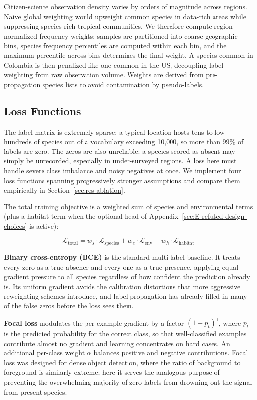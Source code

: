 Citizen-science observation density varies by orders of magnitude across regions. Naive global weighting would upweight common species in data-rich areas while suppressing species-rich tropical communities. We therefore compute region-normalized frequency weights: samples are partitioned into coarse geographic bins, species frequency percentiles are computed within each bin, and the maximum percentile across bins determines the final weight. A species common in Colombia is then penalized like one common in the US, decoupling label weighting from raw observation volume. Weights are derived from pre-propagation species lists to avoid contamination by pseudo-labels.

\subsection{Loss Functions}
\label{sec:loss}

The label matrix is extremely sparse: a typical location hosts tens to low hundreds of species out of a vocabulary exceeding 10,000, so more than 99\% of labels are zero. The zeros are also unreliable: a species scored as absent may simply be unrecorded, especially in under-surveyed regions. A loss here must handle severe class imbalance and noisy negatives at once. We implement four loss functions spanning progressively stronger assumptions and compare them empirically in Section~\ref{sec:res-ablation}.

The total training objective is a weighted sum of species and environmental terms (plus a habitat term when the optional head of Appendix~\ref{sec:E-refuted-design-choices} is active):

\begin{equation*}
\mathcal{L}_\text{total} = w_s \cdot \mathcal{L}_\text{species} + w_e \cdot \mathcal{L}_\text{env} + w_h \cdot \mathcal{L}_\text{habitat}
\end{equation*}

\textbf{Binary cross-entropy (BCE)} is the standard multi-label baseline. It treats every zero as a true absence and every one as a true presence, applying equal gradient pressure to all species regardless of how confident the prediction already is. Its uniform gradient avoids the calibration distortions that more aggressive reweighting schemes introduce, and label propagation has already filled in many of the false zeros before the loss sees them.

\textbf{Focal loss} \citep{lin2017focal} modulates the per-example gradient by a factor $(1 - p_t)^\gamma$, where $p_t$ is the predicted probability for the correct class, so that well-classified examples contribute almost no gradient and learning concentrates on hard cases. An additional per-class weight $\alpha$ balances positive and negative contributions. Focal loss was designed for dense object detection, where the ratio of background to foreground is similarly extreme; here it serves the analogous purpose of preventing the overwhelming majority of zero labels from drowning out the signal from present species.

